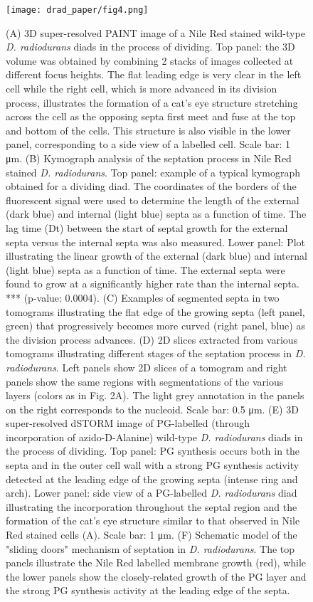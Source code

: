 \begin{figure}
    \centering
    \texttt{[image: drad\_paper/fig4.png]}
    \label{drad_fig4}
\end{figure}
\begin{figure}
    \ContinuedFloat
    \caption[]{(A) 3D super-resolved PAINT image of a Nile Red stained wild-type \textit{D. radiodurans} diads in the process of dividing. Top panel: the 3D volume was obtained by combining 2 stacks of images collected at different focus heights. The flat leading edge is very clear in the left cell while the right cell, which is more advanced in its division process, illustrates the formation of a cat's eye structure stretching across the cell as the opposing septa first meet and fuse at the top and bottom of the cells. This structure is also visible in the lower panel, corresponding to a side view of a labelled cell. Scale bar: 1 μm. (B) Kymograph analysis of the septation process in Nile Red stained \textit{D. radiodurans}. Top panel: example of a typical kymograph obtained for a dividing diad. The coordinates of the borders of the fluorescent signal were used to determine the length of the external (dark blue) and internal (light blue) septa as a function of time. The lag time (Dt) between the start of septal growth for the external septa versus the internal septa was also measured. Lower panel: Plot illustrating the linear growth of the external (dark blue) and internal (light blue) septa as a function of time. The external septa were found to grow at a significantly higher rate than the internal septa. *** (p-value: 0.0004). (C) Examples of segmented septa in two tomograms illustrating the flat edge of the growing septa (left panel, green) that progressively becomes more curved (right panel, blue) as the division process advances. (D) 2D slices extracted from various tomograms illustrating different stages of the septation process in \textit{D. radiodurans}. Left panels show 2D slices of a tomogram and right panels show the same regions with segmentations of the various layers (colors as in Fig. 2A). The light grey annotation in the panels on the right corresponds to the nucleoid. Scale bar: 0.5 μm. (E) 3D super-resolved dSTORM image of PG-labelled (through incorporation of azido-D-Alanine) wild-type \textit{D. radiodurans} diads in the process of dividing. Top panel: PG synthesis occurs both in the septa and in the outer cell wall with a strong PG synthesis activity detected at the leading edge of the growing septa (intense ring and arch). Lower panel: side view of a PG-labelled \textit{D. radiodurans} diad illustrating the incorporation throughout the septal region and the formation of the cat's eye structure similar to that observed in Nile Red stained cells (A). Scale bar: 1 μm. (F) Schematic model of the "sliding doors" mechanism of septation in \textit{D. radiodurans}. The top panels illustrate the Nile Red labelled membrane growth (red), while the lower panels show the closely-related growth of the PG layer and the strong PG synthesis activity at the leading edge of the septa.}
\end{figure}

